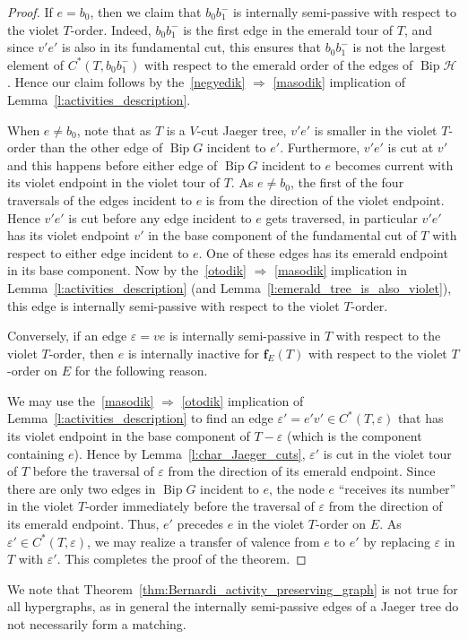 \documentclass[ALCO,ThmDefs,Unicode,epreuves]{cedram}
\newcommand{\HH}{\mathcal H}
\DeclareMathOperator{\bip}{Bip}
\DeclareMathOperator{\Bip}{Bip}
\begin{document}
\begin{proof}
If $e=b_0$, then we claim that $b_0b_1^-$ is internally semi-passive with respect to the violet $T$-order. Indeed, $b_0b_1^-$ is the first edge in the emerald tour of $T$, and since $v'e'$ is also in its fundamental cut, this ensures that $b_0b_1^-$ is not the largest element of $C^*(T,b_0b_1^-)$ with respect to the emerald order of the edges of $\bip\HH$. Hence our claim follows by the~\ref{negyedik} $\Rightarrow$ \ref{masodik} implication of Lemma~\ref{l:activities_description}.

When $e\ne b_0$, note that as $T$ is a $V$-cut Jaeger tree, $v'e'$ is smaller in the violet $T$-order than the other edge of $\bip G$ incident to $e'$. Furthermore, $v'e'$ is cut at $v'$ and this happens before either edge of $\bip G$ incident to $e$ becomes current with its violet endpoint in the violet tour of $T$. As $e\neq b_0$, the first of the four traversals of the edges incident to $e$ is from the direction of the violet endpoint. Hence $v'e'$ is cut before any edge incident to $e$ gets traversed, in particular $v'e'$ has its violet endpoint $v'$ in the base component of the fundamental cut of $T$ with respect to either edge incident to $e$. One of these edges has its emerald endpoint in its base component. Now by the~\ref{otodik} $\Rightarrow$ \ref{masodik} implication in Lemma~\ref{l:activities_description} (and Lemma~\ref{l:emerald_tree_is_also_violet}), this edge is internally semi-passive with respect to the violet $T$-order. 

Conversely, if an edge $\varepsilon=ve$ is internally semi-passive in $T$ with respect to the violet $T$-order, then $e$ is internally inactive for $\mathbf f_E(T)$ with respect to the violet $T$-order on $E$ for the following reason.

We may use the~\ref{masodik} $\Rightarrow$ \ref{otodik} implication of Lemma~\ref{l:activities_description} to find an edge $\varepsilon'=e'v' \in C^*(T,\varepsilon)$ that has its violet endpoint in the base component of $T-\varepsilon$ (which is the component containing $e$). Hence by Lemma~\ref{l:char_Jaeger_cuts}, $\varepsilon'$ is cut in the violet tour of $T$ before the traversal of $\varepsilon$ from the direction of its emerald endpoint. Since there are only two edges in $\Bip G$ incident to $e$, the node $e$ ``receives its number'' in the violet $T$-order immediately before the traversal of $\varepsilon$ from the direction of its emerald endpoint. Thus, $e'$ precedes $e$ in the violet $T$-order on $E$. As $\varepsilon'\in C^*(T,\varepsilon)$, we may realize a transfer of valence from $e$ to $e'$ by replacing $\varepsilon$ in $T$ with $\varepsilon'$. This completes the proof of the theorem.
\end{proof}

We note that Theorem~\ref{thm:Bernardi_activity_preserving_graph} is not true for all hypergraphs, as in general the internally semi-passive edges of a Jaeger tree do not necessarily form a matching.






\end{document}
